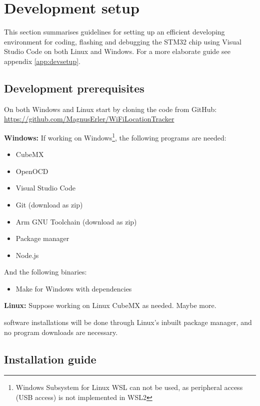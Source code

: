 \section{Development setup} \label{sec:dev-setup}
This section summarises guidelines for setting up an efficient developing environment for coding, flashing and debugging the STM32 chip using Visual Studio Code on both Linux and Windows. For a more elaborate guide see appendix \ref{app:devsetup}.

\subsection{Development prerequisites}
On both Windows and Linux start by cloning the code from GitHub: \url{https://github.com/MagnusErler/WiFiLocationTracker}

\textbf{Windows:}
If working on Windows\footnote{Windows Subsystem for Linux \ac{WSL} can not be used, as peripheral access (USB access) is not implemented in WSL2}, the following programs are needed:
\begin{itemize}
    \item CubeMX 
    \item OpenOCD 
    \item Visual Studio Code 
    \item Git (download as zip) 
    \item Arm GNU Toolchain (download as zip) 
    \item Package manager 
    \item Node.js
\end{itemize}

And the following binaries:
\begin{itemize}
    \item Make for Windows with dependencies 
\end{itemize}

\textbf{Linux:}
Suppose working on Linux CubeMX as needed. Maybe more.

software installations will be done through Linux's inbuilt package manager, and no program downloads are necessary.

\subsection{Installation guide}

